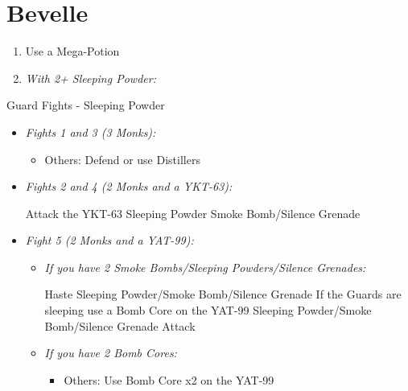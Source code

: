 \chapter{Bevelle}
\begin{enumerate}
    \item Use a Mega-Potion
    \item \textit{With 2+ Sleeping Powder:}
\end{enumerate}
\begin{battle}{Guard Fights - Sleeping Powder}
    \begin{itemize}
        \item \textit{Fights 1 and 3 (3 Monks):}
        \begin{itemize}
            \tidusf Attack
            \item Others: Defend or use Distillers
        \end{itemize}
        \item \textit{Fights 2 and 4 (2 Monks and a YKT-63):}
        \begin{itemize}
            \tidusf Attack the YKT-63
            \rikkuf Sleeping Powder
            \kimahrif Smoke Bomb/Silence Grenade
        \end{itemize}
        \item \textit{Fight 5 (2 Monks and a YAT-99):}
        \begin{itemize}
            \item \textit{If you have 2 Smoke Bombs/Sleeping Powders/Silence Grenades:}
            \begin{itemize}
                \tidusf Haste \rikku
                \rikkuf Sleeping Powder/Smoke Bomb/Silence Grenade
                \rikkuf If the Guards are sleeping use a Bomb Core on the YAT-99
                \rikkuf Sleeping Powder/Smoke Bomb/Silence Grenade
                \tidusf Attack
            \end{itemize}
            \item \textit{If you have 2 Bomb Cores:}
            \begin{itemize}
                \tidusf Attack the Monks
                \item Others: Use Bomb Core x2 on the YAT-99
            \end{itemize}
        \end{itemize}
    \end{itemize}
\end{battle}
